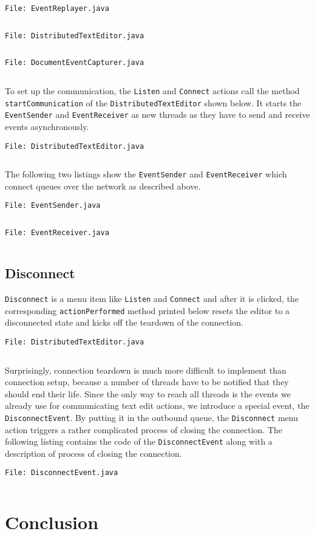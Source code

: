 \documentclass[a4paper,draft,12pt,oneside,article,table]{memoir}
\newcommand{\srcpath}{../ex09/src/main/java/ddist}
\newcommand{\inmnt}[3]{\noindent\texttt{\color{gray}File: #3}\vspace{-1em}\inputminted[tabsize=4,firstline=#1,firstnumber=#1,lastline=#2,linenos]{java}{\srcpath/#3}}
\newcommand{\mil}[1]{\texttt{#1}}
\begin{document}
\inmnt{1}{1000}{EventReplayer.java}

\inmnt{43}{67}{DistributedTextEditor.java}

\inmnt{30}{39}{DocumentEventCapturer.java}

To set up the communication, the \mil{Listen} and \mil{Connect} actions
call the method \mil{startCommunication} of the
\mil{DistributedTextEditor} shown below. It starts the \mil{EventSender}
and \mil{EventReceiver} as new threads as they have to send and receive
events asynchronously.

\inmnt{300}{318}{DistributedTextEditor.java}

The following two listings show the \mil{EventSender} and
\mil{EventReceiver} which connect queues over the network as described
above.

\inmnt{1}{1000}{EventSender.java}

\inmnt{1}{1000}{EventReceiver.java}

\section{Disconnect}

\mil{Disconnect} is a menu item like \mil{Listen} and \mil{Connect} and
after it is clicked, the corresponding \mil{actionPerformed} method
printed below resets the editor to a disconnected state and kicks off
the teardown of the connection.

\inmnt{230}{240}{DistributedTextEditor.java}

Surprisingly, connection teardown is much more difficult to implement
than connection setup, because a number of threads have to be notified
that they should end their life. Since the only way to reach all threads
is the events we already use for communicating text edit actions, we
introduce a special event, the \mil{DisconnectEvent}. By putting it in
the outbound queue, the \mil{Disconnect} menu action triggers a rather
complicated process of closing the connection. The following listing
contains the code of the \mil{DisconnectEvent} along with a description
of process of closing the connection.

\inmnt{1}{1000}{DisconnectEvent.java}


\chapter{Conclusion}

\end{document}

